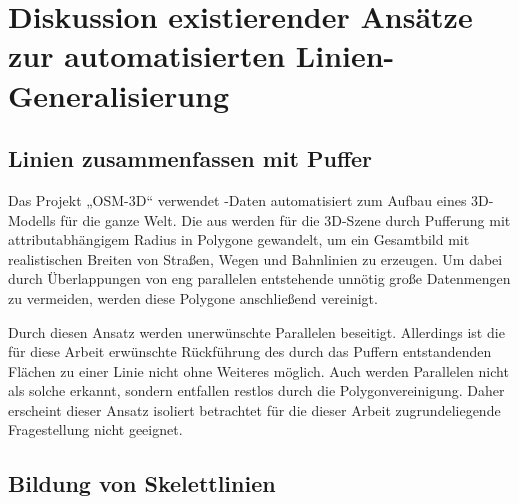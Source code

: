 \documentclass[../main/thesis.tex]{subfiles}
\begin{document}
\section[Diskussion existierender Ansätze]{Diskussion existierender Ansätze zur automatisierten Linien-Generalisierung}

\subsection{Linien zusammenfassen mit Puffer} \label{buffer}

Das Projekt „OSM-3D“ verwendet \osm-Daten automatisiert zum Aufbau eines 3D-Modells für die ganze Welt. Die  aus \osm{} werden für die 3D-Szene durch Pufferung mit attributabhängigem Radius in Polygone gewandelt, um ein Gesamtbild mit realistischen Breiten von Straßen, Wegen und Bahnlinien zu erzeugen. Um dabei durch Überlappungen von eng parallelen  entstehende unnötig große Datenmengen zu vermeiden, werden diese Polygone anschließend vereinigt. 

Durch diesen Ansatz werden unerwünschte Parallelen beseitigt. Allerdings ist die für diese Arbeit erwünschte Rückführung des durch das Puffern entstandenden Flächen zu einer Linie nicht ohne Weiteres möglich. Auch werden Parallelen nicht als solche erkannt, sondern entfallen restlos durch die Polygonvereinigung. Daher erscheint dieser Ansatz isoliert betrachtet für die dieser Arbeit zugrundeliegende Fragestellung nicht geeignet.


\subsection{Bildung von Skelettlinien}
\end{document}
